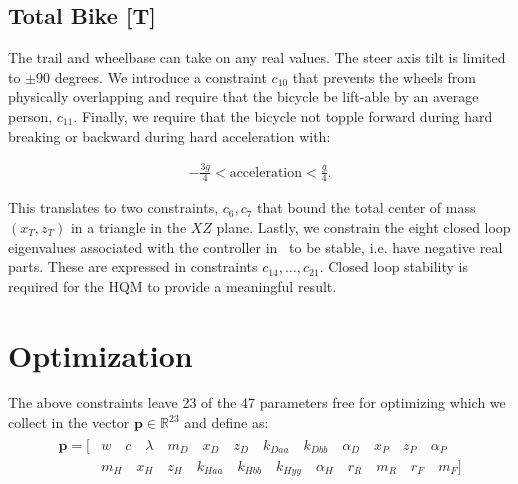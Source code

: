 \documentclass{bmd2019a}
\begin{document}
\subsection{Total Bike [T]}
%
The trail and wheelbase can take on any real values. The steer axis tilt is
limited to $\pm90$ degrees. We introduce a constraint $c_{10}$ that prevents
the wheels from physically overlapping and require that the bicycle be
lift-able by an average person, $c_{11}$. Finally, we require that the bicycle
not topple forward during hard breaking or backward during hard acceleration
with:

\begin{align}
  -\frac{3g}{4} < \textrm{acceleration} < \frac{g}{4}\textrm{.}
\end{align}

This translates to two constraints, $c_6,c_7$ that bound the total center of
mass $(x_T,z_T)$ in a triangle in the $XZ$ plane. Lastly, we constrain the
eight closed loop eigenvalues associated with the controller in~\cite{Hess2012}
to be stable, i.e. have negative real parts. These are expressed in
constraints $c_{14},\ldots,c_{21}$. Closed loop stability is required for the
HQM to provide a meaningful result.

\section{Optimization}
%
The above constraints leave 23 of the 47 parameters free for optimizing which
we collect in the vector $\mathbf{p}\in\mathbb{R}^{23}$ and define as:
%
\begin{align}
  \begin{split}
    \mathbf{p} = [ &
       w        \quad
       c        \quad
       \lambda  \quad
       m_D      \quad
       x_D      \quad
       z_D      \quad
       k_{Daa}  \quad
       k_{Dbb}  \quad
       \alpha_D \quad
       x_P      \quad
       z_P      \quad
       \alpha_P \\
     & m_H      \quad
       x_H      \quad
       z_H      \quad
       k_{Haa}  \quad
       k_{Hbb}  \quad
       k_{Hyy}  \quad
       \alpha_H \quad
       r_R      \quad
       m_R      \quad
       r_F      \quad
       m_F]
  \end{split}
\end{align}
\end{document}
